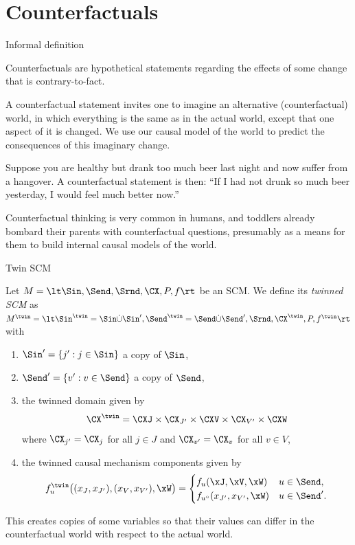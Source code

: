 \part{Counterfactuals}
\frame{\partpage}

\begin{frame}{Informal definition}
  \begin{definition}[Informal]
Counterfactuals are hypothetical statements regarding the effects of some change that is contrary-to-fact.
  \end{definition}

  A counterfactual statement invites one to imagine an alternative (counterfactual) world, in which 
  everything is the same as in the actual world, except that one aspect of it is changed.
  We use our causal model of the world to predict the consequences of this imaginary change.

  \begin{example}
  Suppose you are healthy but drank too much beer last night and now suffer from a hangover. 
  A counterfactual statement is then: ``If I had not drunk so much beer yesterday, I would feel much better now.''
  \end{example}

  Counterfactual thinking is very common in humans, and toddlers already bombard
  their parents with counterfactual questions, presumably as a means for them
  to build internal causal models of the world.
\end{frame}

\begin{frame}{Twin SCM}
  \begin{Def}[\ref{def:twin_scm}]
  Let $M = \lt \Sin, \Send, \Srnd, \CX, P, f \rt$ be an SCM. We define its \emph{twinned SCM} as
    $M^\twin = \lt \Sin^\twin = \Sin \dot\cup \Sin', \Send^\twin = \Send \dot\cup \Send', \Srnd, \CX^\twin, P, f^\twin \rt$
  with
  \begin{enumerate}
    \item $\Sin' = \{j' : j \in \Sin\}$ a copy of $\Sin$,
    \item $\Send' = \{v' : v \in \Send\}$ a copy of $\Send$,
    \item the twinned domain given by
  $$\CX^\twin = \CXJ \times \CX_{J'} \times \CXV \times \CX_{V'} \times \CXW$$
  where $\CX_{j'} = \CX_j$ for all $j \in J$ and $\CX_{v'} = \CX_v$ for all $v \in V$,
    \item the twinned causal mechanism components given by
      \vspace{-0.5\baselineskip}
    $$f^\twin_u\big((x_J,x_{J'}),(x_V,x_{V'}),\xW\big) = 
    \begin{cases}
      f_u(\xJ,\xV,\xW) & u \in \Send,  \\
      f_{u^\circ}(x_{J'},x_{V'},\xW) & u \in \Send'.
    \end{cases}$$
  \end{enumerate}
  \end{Def}
  This creates copies of some variables so that their values can differ in the counterfactual world with respect to the actual world.
\end{frame}


